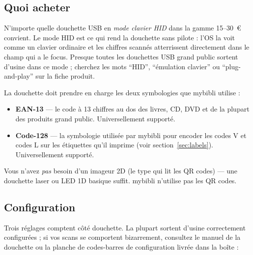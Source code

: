 \subsection*{Quoi acheter}

N'importe quelle douchette USB en \emph{mode clavier HID} dans la gamme 15--30~€ convient. Le mode HID est
ce qui rend la douchette sans pilote : l'OS la voit comme un clavier
ordinaire et les chiffres scannés atterrissent directement dans le
champ qui a le focus. Presque toutes les douchettes USB grand public
sortent d'usine dans ce mode ; cherchez les mots ``HID'',
``émulation clavier'' ou ``plug-and-play'' sur la fiche produit.

La douchette doit prendre en charge les deux symbologies que
mybibli utilise :

\begin{itemize}
  \item \textbf{EAN-13} — le code à 13 chiffres au dos
        des livres, CD, DVD et de la plupart des produits grand
        public. Universellement supporté.
  \item \textbf{Code-128} — la symbologie utilisée
        par mybibli pour encoder les codes V et codes L sur les
        étiquettes qu'il imprime (voir section~\ref{sec:labels}).
        Universellement supporté.
\end{itemize}

Vous n'avez \emph{pas} besoin d'un imageur 2D (le type qui lit les
QR codes) — une douchette laser ou LED 1D basique suffit. mybibli
n'utilise pas les QR codes.

\subsection*{Configuration}

Trois réglages comptent côté douchette. La plupart sortent d'usine
correctement configurées ; si vos scans se comportent bizarrement,
consultez le manuel de la douchette ou la planche de codes-barres de
configuration livrée dans la boîte :

